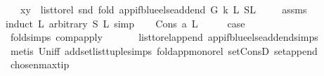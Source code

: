 \begin{isabellebody}
\ \ \ {\isachardoublequoteopen}{\isacharparenleft}{\kern0pt}x{\isacharcomma}{\kern0pt}y{\isacharparenright}{\kern0pt}\ {\isasymin}\ list{\isacharunderscore}{\kern0pt}to{\isacharunderscore}{\kern0pt}rel\ {\isacharparenleft}{\kern0pt}snd\ {\isacharparenleft}{\kern0pt}fold\ {\isacharparenleft}{\kern0pt}app{\isacharunderscore}{\kern0pt}if{\isacharunderscore}{\kern0pt}blue{\isacharunderscore}{\kern0pt}else{\isacharunderscore}{\kern0pt}add{\isacharunderscore}{\kern0pt}end\ G\ k{\isacharparenright}{\kern0pt}\ L{}\ {\isacharparenleft}{\kern0pt}S{\isacharcomma}{\kern0pt}L{}{\isacharparenright}{\kern0pt}{\isacharparenright}{\kern0pt}{\isacharparenright}{\kern0pt}{\isachardoublequoteclose}\ \isanewline
%
\isadelimproof
\ \ %
\endisadelimproof
%
\isatagproof
{}\isamarkupfalse%
\ assms\ \isanewline
{}\isamarkupfalse%
{\isacharparenleft}{\kern0pt}induct\ L{}\ arbitrary{\isacharcolon}{\kern0pt}\ S\ L{}{\isacharcomma}{\kern0pt}\ simp{\isacharparenright}{\kern0pt}\isanewline
\ \ \isamarkupfalse%
\ {\isacharparenleft}{\kern0pt}Cons\ a\ L{}{\isacharparenright}{\kern0pt}\isanewline
\ \ \isamarkupfalse%
\ \isamarkupfalse%
\ {\isacharquery}{\kern0pt}case\ \isanewline
\ \ \ \ \isamarkupfalse%
\ fold{\isachardot}{\kern0pt}simps{\isacharparenleft}{\kern0pt}{}{\isacharparenright}{\kern0pt}\ comp{\isacharunderscore}{\kern0pt}apply\ \isanewline
\ \ \ \ \isamarkupfalse%
\ list{\isacharunderscore}{\kern0pt}to{\isacharunderscore}{\kern0pt}rel{\isacharunderscore}{\kern0pt}append\ app{\isacharunderscore}{\kern0pt}if{\isacharunderscore}{\kern0pt}blue{\isacharunderscore}{\kern0pt}else{\isacharunderscore}{\kern0pt}add{\isacharunderscore}{\kern0pt}end{\isachardot}{\kern0pt}simps\isanewline
\ \ \ \ \isamarkupfalse%
\ {\isacharparenleft}{\kern0pt}metis\ Un{\isacharunderscore}{\kern0pt}iff\ add{\isacharunderscore}{\kern0pt}set{\isacharunderscore}{\kern0pt}list{\isacharunderscore}{\kern0pt}tuple{\isachardot}{\kern0pt}simps\ fold{\isacharunderscore}{\kern0pt}app{\isacharunderscore}{\kern0pt}mono{\isacharunderscore}{\kern0pt}rel\ set{\isacharunderscore}{\kern0pt}ConsD\ set{\isacharunderscore}{\kern0pt}append{\isacharparenright}{\kern0pt}\ \ \isanewline
{}\isamarkupfalse%
%
\endisatagproof
{\isafoldproof}%
%
\isadelimproof
\isanewline
%
\endisadelimproof
\isanewline
{}\isamarkupfalse%
\ chosen{\isacharunderscore}{\kern0pt}max{\isacharunderscore}{\kern0pt}tip{\isacharcolon}{\kern0pt}\isanewline

\end{isabellebody}
